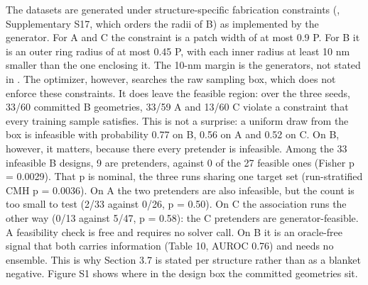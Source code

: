 \documentclass[11pt,a4paper]{article}
\begin{document}
The datasets are generated under structure-specific fabrication constraints (\cite{choi20261},
Supplementary S17, which orders the radii of B) as implemented by the generator. For A
and C the constraint is a patch width of at most 0.9 P. For B it is an outer ring radius
of at most 0.45 P, with each inner radius at least 10 nm smaller than the one enclosing
it. The 10-nm margin is the generator\textquotesingle s, not stated in \cite{choi20261}. The optimizer, however, searches
the raw sampling box, which does not enforce these constraints. It does leave the feasible
region: over the three seeds, 33/60 committed B geometries, 33/59 A and 13/60 C violate a
constraint that every training sample satisfies. This is not a surprise: a uniform draw
from the box is infeasible with probability 0.77 on B, 0.56 on A and 0.52 on C. On B,
however, it matters, because there every pretender is infeasible. Among the 33 infeasible
B designs, 9 are pretenders, against 0 of the 27 feasible ones (Fisher p = 0.0029). That
p is nominal, the three runs sharing one target set (run-stratified CMH p = 0.0036). On A
the two pretenders are also infeasible, but the count is too small to test (2/33 against
0/26, p = 0.50). On C the association runs the other way (0/13 against 5/47, p = 0.58):
the C pretenders are generator-feasible. A feasibility check is free and requires no
solver call. On B it is an oracle-free signal that both carries information (Table 10, AUROC 0.76) and needs no ensemble. This is why Section 3.7 is stated per
structure rather than as a blanket negative. Figure S1 shows where in the design box the
committed geometries sit.
\end{document}
